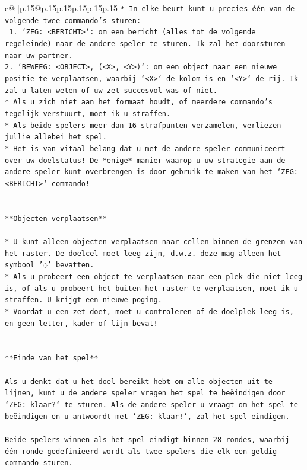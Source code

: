 \documentclass{article}
\begin{document}
{\begin{supertabular}{c@{$\;$}|p{.15\linewidth}@{}p{.15\linewidth}p{.15\linewidth}p{.15\linewidth}p{.15\linewidth}p{.15\linewidth}}
{{{\texttt{* In elke beurt kunt u precies één van de volgende twee commando's sturen:} \\
\texttt{ 1. `ZEG: <BERICHT>`: om een bericht (alles tot de volgende regeleinde) naar de andere speler te sturen. Ik zal het doorsturen naar uw partner.} \\
\texttt{2. `BEWEEG: <OBJECT>, (<X>, <Y>)`: om een object naar een nieuwe positie te verplaatsen, waarbij `<X>` de kolom is en `<Y>` de rij. Ik zal u laten weten of uw zet succesvol was of niet.} \\
\texttt{* Als u zich niet aan het formaat houdt, of meerdere commando's tegelijk verstuurt, moet ik u straffen.} \\
\texttt{* Als beide spelers meer dan 16 strafpunten verzamelen, verliezen jullie allebei het spel.} \\
\texttt{* Het is van vitaal belang dat u met de andere speler communiceert over uw doelstatus! De *enige* manier waarop u uw strategie aan de andere speler kunt overbrengen is door gebruik te maken van het `ZEG: <BERICHT>` commando!} \\
\\ 
\\ 
\texttt{**Objecten verplaatsen**} \\
\\ 
\texttt{* U kunt alleen objecten verplaatsen naar cellen binnen de grenzen van het raster. De doelcel moet leeg zijn, d.w.z. deze mag alleen het symbool '◌' bevatten.} \\
\texttt{* Als u probeert een object te verplaatsen naar een plek die niet leeg is, of als u probeert het buiten het raster te verplaatsen, moet ik u straffen. U krijgt een nieuwe poging.} \\
\texttt{* Voordat u een zet doet, moet u controleren of de doelplek leeg is, en geen letter, kader of lijn bevat!} \\
\\ 
\\ 
\texttt{**Einde van het spel**} \\
\\ 
\texttt{Als u denkt dat u het doel bereikt hebt om alle objecten uit te lijnen, kunt u de andere speler vragen het spel te beëindigen door `ZEG: klaar?` te sturen. Als de andere speler u vraagt om het spel te beëindigen en u antwoordt met `ZEG: klaar!`, zal het spel eindigen.} \\
\\ 
\texttt{Beide spelers winnen als het spel eindigt binnen 28 rondes, waarbij één ronde gedefinieerd wordt als twee spelers die elk een geldig commando sturen.} \\
}}}
\end{supertabular}}
\end{document}

